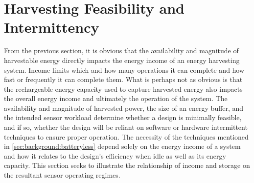 %
%    
%    
%    
%    
%    
%   
%    
%    
%    
%    
%    
%    
%    
%    
%    
%    
%    
%    
%    


\section{Harvesting Feasibility and Intermittency}
\label{sec:intuition:feasibility}
From the previous section, it is obvious that the availability and magnitude of harvestable energy directly impacts the energy income of an energy harvesting system.
Income limits which and how many operations it can complete and how fast or frequently it can complete them. 
What is perhaps not as obvious is that the rechargeable energy capacity used to capture harvested energy also impacts the overall energy income and ultimately the operation of the system.
The availability and magnitude of harvested power, the size of an energy buffer, and the intended sensor workload determine whether a design is minimally feasible, and if so, whether the design will be reliant on software or hardware intermittent techniques to ensure proper operation.
The necessity of the techniques mentioned in \cref{sec:background:batteryless} depend solely on the energy income of a system and how it relates to the design's efficiency when idle as well as its energy capacity. 
This section seeks to illustrate the relationship of income and storage on the resultant sensor operating regimes.

